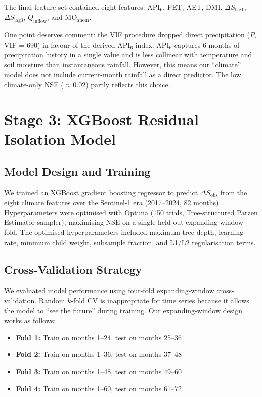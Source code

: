 \documentclass[12pt,a4paper,oneside]{report}
\newcommand{\dS}{\Delta S}
\newcommand{\dSobs}{\Delta S_{\mathrm{obs}}}
\begin{document}
The final feature set contained eight features: API$_6$, PET, AET, DMI,
$\dS_{\text{lag1}}$, $\dS_{\text{lag3}}$, $Q_{\text{inflow}}$, and
MO$_{\text{anom}}$.

One point deserves comment: the VIF procedure dropped direct precipitation
($P$, VIF = 690) in favour of the derived API$_6$ index. API$_6$ captures
6 months of precipitation history in a single value and is less collinear
with temperature and soil moisture than instantaneous rainfall. However, this
means our ``climate'' model does not include current-month rainfall as a
direct predictor. The low climate-only NSE ($\approx 0.02$) partly reflects
this choice.

\section{Stage 3: XGBoost Residual Isolation Model}

\subsection{Model Design and Training}

We trained an XGBoost gradient boosting regressor \citep{Chen2016} to
predict $\dSobs$ from the eight climate features over the Sentinel-1 era
(2017--2024, 82 months). Hyperparameters were optimised with Optuna (150
trials, Tree-structured Parzen Estimator sampler), maximising NSE on a single
held-out expanding-window fold. The optimised hyperparameters included
maximum tree depth, learning rate, minimum child weight, subsample fraction,
and L1/L2 regularisation terms.

\subsection{Cross-Validation Strategy}

We evaluated model performance using four-fold expanding-window
cross-validation. Random $k$-fold CV is inappropriate for time series because
it allows the model to ``see the future'' during training. Our
expanding-window design works as follows:

\begin{itemize}[leftmargin=*]
  \item \textbf{Fold 1:} Train on months 1--24, test on months 25--36
  \item \textbf{Fold 2:} Train on months 1--36, test on months 37--48
  \item \textbf{Fold 3:} Train on months 1--48, test on months 49--60
  \item \textbf{Fold 4:} Train on months 1--60, test on months 61--72
\end{itemize}
\end{document}
